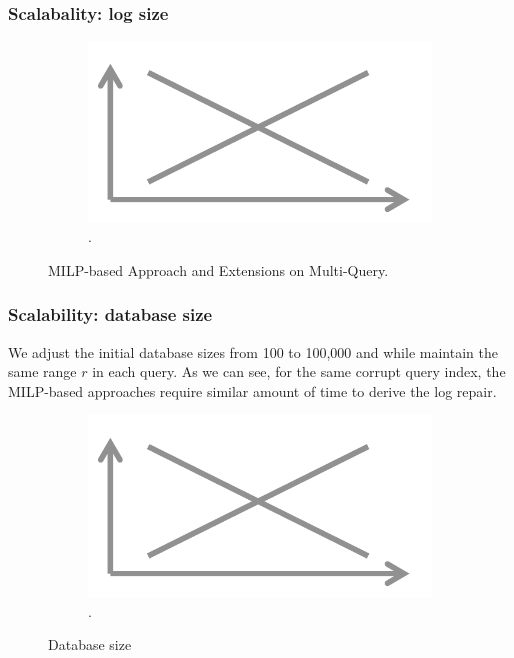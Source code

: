 {\subsubsection{Scalabality: log size}
 \begin{figure}[h]
\centering
  \begin{subfigure}[t]{.48\columnwidth}
  \includegraphics[width = .95\columnwidth]{figures/placeholder}
  \caption{.}
  \label{f:multiquery} 
  \end{subfigure}
  \caption{MILP-based Approach and Extensions on Multi-Query. }
\end{figure}

\subsubsection{Scalability: database size}
We adjust the initial database sizes from 100 to 100,000 and 
while maintain the same range $r$ in each query. As we can see, 
for the same corrupt query index, the MILP-based approaches require
similar amount of time to derive the log repair. 

 \begin{figure}[h]
\centering
  \begin{subfigure}[t]{.48\columnwidth}
  \includegraphics[width = .95\columnwidth]{figures/placeholder}
  \caption{.}
  \label{f:multiquery} 
  \end{subfigure}
  \caption{Database size}
\end{figure}


}
